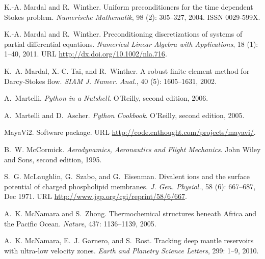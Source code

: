 \begin{thebibliography}{467}
K.-A. Mardal and R.~Winther.
\newblock Uniform preconditioners for the time dependent {S}tokes problem.
\newblock \emph{Numerische Mathematik}, 98 (2): 305--327,
  2004.
\newblock ISSN 0029-599X.

K.-A. Mardal and R.~Winther.
\newblock Preconditioning discretizations of systems of partial differential
  equations.
\newblock \emph{Numerical Linear Algebra with Applications}, 18
  (1): 1--40, 2011.
\newblock URL \url{http://dx.doi.org/10.1002/nla.716}.

K.~A. Mardal, X.-C. Tai, and R.~Winther.
\newblock A robust finite element method for {D}arcy-{S}tokes flow.
\newblock \emph{SIAM J. Numer. Anal.}, 40 (5): 1605--1631,
  2002.

A.~Martelli.
\newblock \emph{Python in a Nutshell}.
\newblock O'Reilly, second edition, 2006.

A.~Martelli and D.~Ascher.
\newblock \emph{Python Cookbook}.
\newblock O'Reilly, second edition, 2005.

{MayaVi2}.
\newblock Software package.
\newblock URL \url{http://code.enthought.com/projects/mayavi/}.

B.~W. McCormick.
\newblock \emph{Aerodynamics, Aeronautics and Flight Mechanics}.
\newblock John Wiley and Sons, second edition, 1995.

S.~G. McLaughlin, G.~Szabo, and G.~Eisenman.
\newblock Divalent ions and the surface potential of charged phospholipid
  membranes.
\newblock \emph{J. Gen. Physiol.}, 58 (6): 667--687, Dec
  1971.
\newblock URL \url{http://www.jgp.org/cgi/reprint/58/6/667}.

A.~K. McNamara and S.~Zhong.
\newblock Thermochemical structures beneath {A}frica and the {P}acific {O}cean.
\newblock \emph{Nature}, 437: 1136--1139, 2005.

A.~K. McNamara, E.~J. Garnero, and S.~Rost.
\newblock Tracking deep mantle reservoirs with ultra-low velocity zones.
\newblock \emph{Earth and Planetry Science Letters}, 299: 1--9, 2010.


\end{thebibliography}
